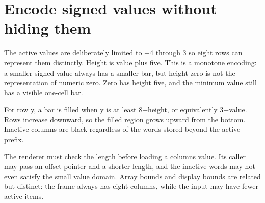 \section{Encode signed values without hiding
  them}\label{009-sorting-visualizer-p01-encode-signed-values-without-hiding-them}

The active values are deliberately limited to \ensuremath{-}4 through 3 so eight rows
can represent them distinctly. Height is value plus five. This is a
monotone encoding: a smaller signed value always has a smaller bar, but
height zero is not the representation of numeric zero. Zero has height
five, and the minimum value still has a visible one-cell bar.

For row y, a bar is filled when y is at least 8\ensuremath{-}height, or equivalently
3\ensuremath{-}value. Rows increase downward, so the filled region grows upward from
the bottom. Inactive columns are black regardless of the words stored
beyond the active prefix.

The renderer must check the length before loading a
column\textquotesingle s value. Its caller may pass an offset pointer
and a shorter length, and the inactive words may not even satisfy the
small value domain. Array bounds and display bounds are related but
distinct: the frame always has eight columns, while the input may have
fewer active items.
